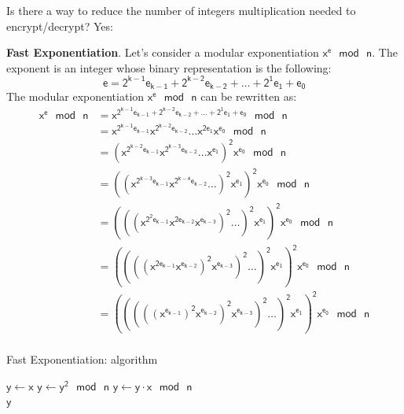 \documentclass{article}
\begin{document}
\par \noindent Is there a way to reduce the number of integers multiplication needed to encrypt/decrypt? Yes:

\begin{boxH}
    \textbf{Fast Exponentiation}. Let's consider a modular exponentiation $\mathsf{x^e \text{ } mod \text{ } n}$. The exponent is an integer whose binary representation is the following:
    \begin{equation*}
        \mathsf{e = 2^{k-1}e_{k-1} + 2^{k-2}e_{k-2} + \dots + 2^{1}e_{1} + e_{0}}
    \end{equation*}
    The modular exponentiation $\mathsf{x^e \text{ } mod \text{ } n}$ can be rewritten as:
    \begin{align*}
        \mathsf{x^e \text{ } mod \text{ } n} &= \mathsf{x^{2^{k-1}e_{k-1} + 2^{k-2}e_{k-2} + \dots + 2^{1}e_{1} + e_{0}} \text{ } mod \text{ } n} \\
        &= \mathsf{x^{2^{k-1}e_{k-1}} x^{2^{k-2}e_{k-2}} \dots x^{2e_{1}} x^{e_{0}} \text{ } mod \text{ } n} \\
        &= \mathsf{(x^{2^{k-2}e_{k-1}} x^{2^{k-3}e_{k-2}} \dots x^{e_{1}})^2 x^{e_{0}} \text{ } mod \text{ } n} \\
        &= \mathsf{((x^{2^{k-3}e_{k-1}} x^{2^{k-4}e_{k-2}} \dots)^2 x^{e_{1}})^2 x^{e_{0}} \text{ } mod \text{ } n} \\
        &= \mathsf{(((x^{2^{2}e_{k-1}} x^{2e_{k-2}} x^{e_{k-3}})^2 \dots)^2 x^{e_{1}})^2 x^{e_{0}} \text{ } mod \text{ } n} \\
        &= \mathsf{((((x^{2e_{k-1}} x^{e_{k-2}})^2 x^{e_{k-3}})^2 \dots)^2 x^{e_{1}})^2 x^{e_{0}} \text{ } mod \text{ } n} \\
        &= \mathsf{(((((x^{e_{k-1}})^2 x^{e_{k-2}})^2 x^{e_{k-3}})^2 \dots)^2 x^{e_{1}})^2 x^{e_{0}} \text{ } mod \text{ } n} \\
    \end{align*}
\end{boxH}

\begin{algorithm}
    \caption{Fast Exponentiation: algorithm}
    \label{alg:fast_exponentiation}
    \begin{algorithmic}
        \State $\mathsf{y \gets x}$
            \State $\mathsf{y \gets y^2 \text{ } mod \text{ } n}$
                 \State $\mathsf{y \gets y \cdot x \text{ } mod \text{ } n}$
            \EndIf
        \EndFor \\
        \Return $\mathsf{y}$
    \end{algorithmic}
\end{algorithm}
\end{document}
